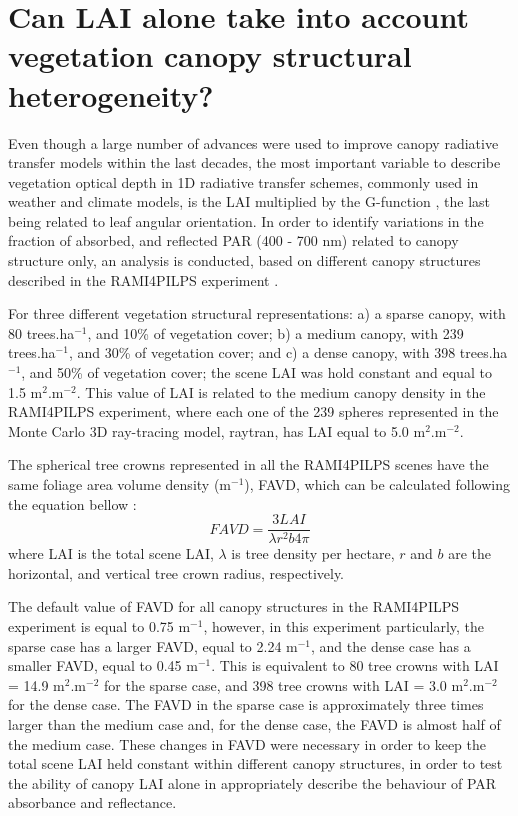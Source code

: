 \documentclass[a4paper,11pt]{report}
\begin{document}
\section{Can LAI alone take into account vegetation canopy structural heterogeneity?}\label{section:lai}
Even though a large number of advances were used to improve canopy radiative transfer models within the last decades, the most important variable to describe vegetation optical depth in 1D radiative transfer schemes, commonly used in weather and climate models, is the LAI \citep{Yang2001} multiplied by the G-function \citep{Ross1981}, the last being related to leaf angular orientation. In order to identify variations in the fraction of absorbed, and reflected PAR (400 - 700 nm) related to canopy structure only, an analysis is conducted, based on different canopy structures described in the RAMI4PILPS experiment \citep{Widlowski2011}.

For three different vegetation structural representations: a) a sparse canopy, with 80 trees.ha$^{-1}$, and 10\% of vegetation cover; b) a medium canopy, with 239 trees.ha$^{-1}$, and 30\% of vegetation cover; and c) a dense canopy, with 398 trees.ha$^{-1}$, and 50\% of vegetation cover; the scene LAI was hold constant and equal to 1.5 m$^2$.m$^{-2}$. This value of LAI is related to the medium canopy density in the RAMI4PILPS experiment, where each one of the 239 spheres represented in the Monte Carlo 3D ray-tracing model, raytran, has LAI equal to 5.0 m$^2$.m$^{-2}$. 

The spherical tree crowns represented in all the RAMI4PILPS scenes have the same foliage area volume density (m$^{-1}$), FAVD, which can be calculated following the equation bellow \citep{quaife2008}:
\begin{equation}
 FAVD = \frac{3 LAI}{\lambda r^2 b 4 \pi}
\end{equation}\label{equation:favd}
\noindent where LAI is the total scene LAI, $\lambda$ is tree density per hectare, $r$ and $b$ are the horizontal, and vertical tree crown radius, respectively.

The default value of FAVD for all canopy structures in the RAMI4PILPS experiment is equal to 0.75 m$^{-1}$, however, in this experiment particularly, the sparse case has a larger FAVD, equal to 2.24 m$^{-1}$, and the dense case has a smaller FAVD, equal to 0.45 m$^{-1}$. This is equivalent to 80 tree crowns with LAI = 14.9 m$^2$.m$^{-2}$ for the sparse case, and 398 tree crowns with LAI = 3.0 m$^2$.m$^{-2}$ for the dense case. The FAVD in the sparse case is approximately three times larger than the medium case and, for the dense case, the FAVD is almost half of the medium case. These changes in FAVD were necessary in order to keep the total scene LAI held constant within different canopy structures, in order to test the ability of canopy LAI alone in appropriately describe the behaviour of PAR absorbance and reflectance.
\end{document}
